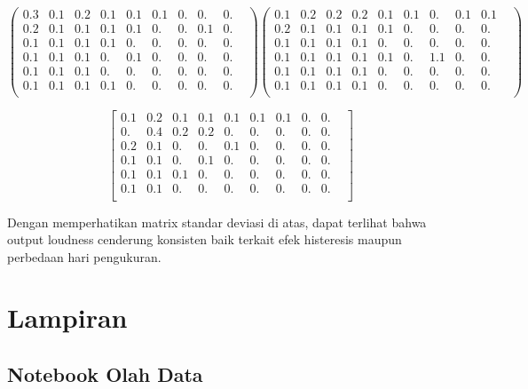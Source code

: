 \documentclass[12pt,]{article}
\begin{document}
\begin{enumerate}
		\[ \left( \begin{matrix}
			0.3&0.1&0.2&0.1&0.1&0.1&0.&0.&0.&\\
			0.2&0.1&0.1&0.1&0.1&0.&0.&0.1&0.&\\
			0.1&0.1&0.1&0.1&0.&0.&0.&0.&0.&\\
			0.1&0.1&0.1&0.&0.1&0.&0.&0.&0.&\\
			0.1&0.1&0.1&0.&0.&0.&0.&0.&0.&\\
			0.1&0.1&0.1&0.1&0.&0.&0.&0.&0.&\\
		\end{matrix} \right)
		\left( \begin{matrix}
			0.1&0.2&0.2&0.2&0.1&0.1&0.&0.1&0.1\\
			0.2&0.1&0.1&0.1&0.1&0.&0.&0.&0.&\\
			0.1&0.1&0.1&0.1&0.&0.&0.&0.&0.&\\
			0.1&0.1&0.1&0.1&0.1&0.&1.1&0.&0.&\\
			0.1&0.1&0.1&0.1&0.&0.&0.&0.&0.&\\
			0.1&0.1&0.1&0.1&0.&0.&0.&0.&0.&\\
		\end{matrix} \right)
		\]

		\[\left[
		\begin{matrix}
			0.1&0.2&0.1&0.1&0.1&0.1&0.1&0.&0.&\\
			0.&0.4&0.2&0.2&0.&0.&0.&0.&0.&\\
			0.2&0.1&0.&0.&0.1&0.&0.&0.&0.&\\
			0.1&0.1&0.&0.1&0.&0.&0.&0.&0.&\\
			0.1&0.1&0.1&0.&0.&0.&0.&0.&0.&\\
			0.1&0.1&0.&0.&0.&0.&0.&0.&0.&\\
		\end{matrix}
		\right]\]

	\end{enumerate}

	Dengan memperhatikan matrix standar deviasi di atas, dapat terlihat bahwa output loudness cenderung konsisten
	baik terkait efek histeresis maupun perbedaan hari pengukuran.

	\newpage
	\section{Lampiran}

	\subsection{Notebook Olah Data}
	
\end{document}
